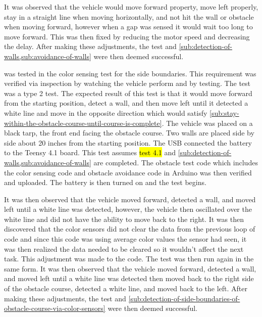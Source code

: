 \documentclass[11pt]{report}
\begin{document}
It was observed that the vehicle would move forward property, move left properly, stay in a straight line when moving horizontally, and not hit the wall or obstacle when moving forward, however when a gap was sensed it would wait too long to move forward. This was then fixed by reducing the motor speed and decreasing the delay. After making these adjustments, the test and \cref{sub:detection-of-walls,sub:avoidance-of-walls} were then deemed successful.

\label{tst:color-sensing-for-side-boundaries}
 was tested in the color sensing test for the side boundaries. This requirement was verified via inspection by watching the vehicle perform and by testing. The test was a type 2 test. The expected result of this test is that it would move forward from the starting position, detect a wall, and then move left until it detected a white line and move in the opposite direction which would satisfy \cref{sub:stay-within-the-obstacle-course-until-course-is-complete}. The vehicle was placed on a black tarp, the front end facing the obstacle course. Two walls are placed side by side about 20 inches from the starting position. The USB connected the battery to the Teensy 4.1 board. This test assumes \hl{test 4.1} and \cref{sub:detection-of-walls,sub:avoidance-of-walls} are completed. The obstacle test code which includes the color sensing code and obstacle avoidance code in Arduino was then verified and uploaded. The battery is then turned on and the test begins.

It was then observed that the vehicle moved forward, detected a wall, and moved left until a white line was detected, however, the vehicle then oscillated over the white line and did not have the ability to move back to the right. It was then discovered that the color sensors did not clear the data from the previous loop of code and since this code was using average color values the sensor had seen, it was then realized the data needed to be cleared so it wouldn’t affect the next task. This adjustment was made to the code. The test was then run again in the same form. It was then observed that the vehicle moved forward, detected a wall, and moved left until a white line was detected then moved back to the right side of the obstacle course, detected a white line, and moved back to the left. After making these adjustments, the test and \cref{sub:detection-of-side-boundaries-of-obstacle-course-via-color-sensors} were then deemed successful.
\end{document}
